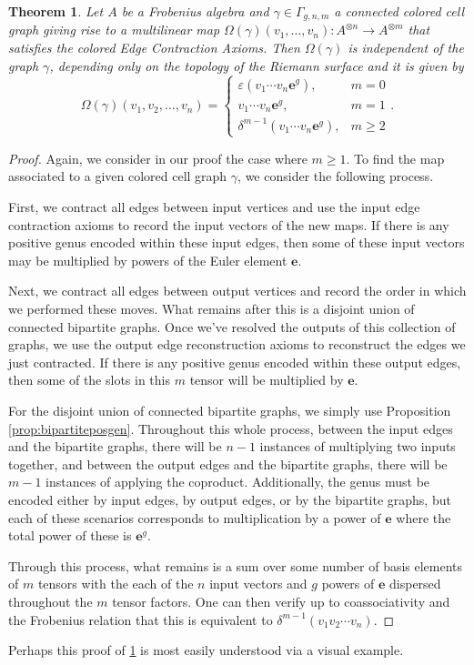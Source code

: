 \documentclass{amsart}
\newcommand{\be}{\begin{equation}}
\newcommand{\ee}{\end{equation}}
\newcommand{\tensor}{\otimes}
\newcommand{\Atn}{A^{\tensor n}}
\newcommand{\Atm}{A^{\tensor m}}
\newcommand{\eps}{\varepsilon}
\newcommand{\eul}{\mathbf{e}}
\newtheorem{Thm}[Lem]{Theorem}
\theoremstyle{definition}
\begin{document}
\begin{Thm}\label{thm:cellgraphclassification}
Let $A$ be a Frobenius algebra and   $\gamma\in\Gamma_{g,n,m}$ a connected colored cell graph giving rise to a multilinear map $\Omega(\gamma)(v_1,\ldots, v_n) :\Atn\longrightarrow\Atm$ that satisfies the colored Edge Contraction Axioms. Then $\Omega(\gamma)$ is independent of the graph $\gamma$, depending only on the topology of the Riemann surface and it is given by
        \be\label{eqn:cellgraphclassification}
    \Omega(\gamma)(v_1,v_2,\ldots,v_n)=\begin{cases}
        \eps(v_1\cdots v_n\eul^g),& m=0\\
        v_1\cdots v_n\eul^g,& m=1\\
        \delta^{m-1}(v_1\cdots v_n\eul^g),& m\geq 2
    \end{cases}.
    \ee
\end{Thm}
\begin{proof}
    Again, we consider in our proof the case where $m\geq 1$. To find the map associated to a given colored cell graph $\gamma$, we consider the following process.

    \noindent First, we contract all edges between input vertices and use the input edge contraction axioms to record the input vectors of the new maps. If there is any positive genus encoded within these input edges, then some of these input vectors may be multiplied by powers of the Euler element $\eul$.

    \noindent Next, we contract all edges between output vertices and record the order in which we performed these moves. What remains after this is a disjoint union of connected bipartite graphs. Once we've resolved the outputs of this collection of graphs, we use the output edge reconstruction axioms to reconstruct the edges we just contracted. If there is any positive genus encoded within these output edges, then some of the slots in this $m$ tensor will be multiplied by $\eul$.

    \noindent For the disjoint union of connected bipartite graphs, we simply use Proposition \ref{prop:bipartiteposgen}. Throughout this whole process, between the input edges and the bipartite graphs, there will be $n-1$ instances of multiplying two inputs together, and between the output edges and the bipartite graphs, there will be $m-1$ instances of applying the coproduct. Additionally, the genus must be encoded either by input edges, by output edges, or by the bipartite graphs, but each of these scenarios corresponds to multiplication by a power of $\eul$ where the total power of these is $\eul^g$.

    \noindent Through this process, what remains is a sum over some number of basis elements of $m$ tensors with the each of the $n$ input vectors and $g$ powers of $\eul$ dispersed throughout the $m$ tensor factors. One can then verify up to coassociativity and the Frobenius relation that this is equivalent to $\delta^{m-1}(v_1v_2\cdots v_n).$
\end{proof}
\noindent Perhaps this proof of \ref{thm:cellgraphclassification} is most easily understood via a visual example.
\end{document}
